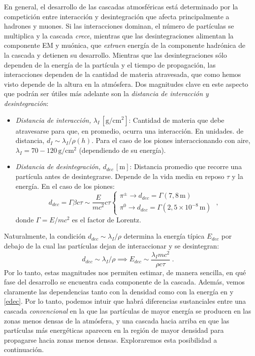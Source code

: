 \documentclass[12 pt, a4paper]{article} %
\numberwithin{equation}{section}
\numberwithin{figure}{section}
\numberwithin{table}{section}
\begin{document}
En general, el desarrollo de las cascadas atmosféricas está determinado por la competición entre interacción y desintegración que afecta principalmente a hadrones y muones. Si las interacciones dominan, el número de partículas se multiplica y la cascada \textit{crece}, mientras que las desintegraciones alimentan la componente EM y muónica, que \textit{extraen} energía de la componente hadrónica de la cascada y detienen su desarrollo. Mientras que las desintegraciones sólo dependen de la energía de la partícula y el tiempo de propagación, las interacciones dependen de la cantidad de materia atravesada, que como hemos visto depende de la altura en la atmósfera. Dos magnitudes clave en este aspecto que podrán ser útiles más adelante son la \textit{distancia de interacción y desintegración}:
\begin{itemize}
	\item \textit{Distancia de interacción,} $\lambda_I\,\left[\mathrm{g/cm^2}\right]$: Cantidad de materia que debe atravesarse para que, en promedio, ocurra una interacción. En unidades. de distancia, $d_I\sim\lambda_I/\rho(h)$. Para el caso de los piones interaccionando con aire, $\lambda_I=70-120\,\mathrm{g/cm^2}$ (dependiendo de su energía).

\item \textit{Distancia de desintegración, }$d_{dec}\,\left[\mathrm{m}\right]$: Distancia promedio que recorre una partícula antes de desintegrarse. Depende de la vida media en reposo $\tau$ y la energía. En el caso de los piones:
\begin{equation}
	d_{dec}=\Gamma\beta c\tau\sim\frac{E}{mc^2}c\tau\left\{\begin{array}{l}\pi^\pm\rightarrow d_{dec}=\Gamma\left(7,8 \,\mathrm{m}\right)\\
\pi^0\rightarrow d_{dec}=\Gamma\left(2,5\times10^{-8}\,\mathrm{m}\right)\end{array}\right.\;,
\label{ec24}
\end{equation}
donde $\Gamma = E/mc^2$ es el factor de Lorentz.
\end{itemize}
Naturalmente, la condición $d_{dec}\sim\lambda_I/\rho$ determina la energía típica $E_{dec}$ por debajo de la cual las partículas dejan de interaccionar y se desintegran:
\begin{equation}
	d_{dec}\sim\lambda_I/\rho\implies E_{dec}\sim \frac{\lambda_I mc^2}{\rho c \tau}\;.\label{edec}
\end{equation} Por lo tanto, estas magnitudes nos permiten estimar, de manera sencilla, en qué fase del desarrollo se encuentra cada componente de la cascada. Además, vemos claramente las dependencias tanto con la densidad como con la energía en y \eqref{edec}. Por lo tanto, podemos intuir que habrá diferencias sustanciales entre una cascada \textit{convencional} en la que las partículas de mayor energía se producen en las zonas menos densas de la atmósfera, y una cascada hacia arriba en que las partículas más energéticas aparecen en la región de mayor densidad para propagarse hacia zonas menos densas. Exploraremos esta posibilidad a continuación.
\end{document}
